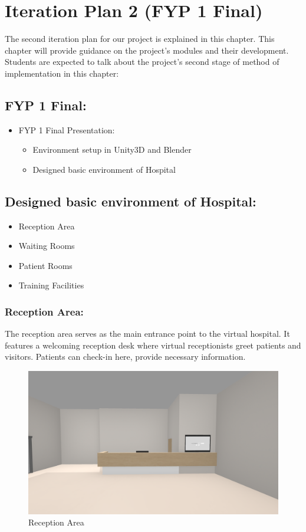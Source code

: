 \chapter{Iteration Plan 2 (FYP 1 Final)}
\label{ch:iter2}

The second iteration plan for our project is explained in this chapter. This chapter will provide guidance on the project’s modules and their development. Students are expected to talk about the project’s second stage of method of implementation in this chapter:

\section{FYP 1 Final:}
\begin{itemize}
    \item FYP 1 Final Presentation: \begin{itemize}
    \item Environment setup in Unity3D and Blender 
    \item Designed basic environment of Hospital
    \end{itemize}
\end{itemize}

\section{Designed basic environment of Hospital:}
	\begin{itemize}
	\item Reception Area
	\item Waiting Rooms
	\item Patient Rooms
	\item Training Facilities
\end{itemize}	
	
\subsection{Reception Area:}
The reception area serves as the main entrance point to the virtual hospital. It features a welcoming reception desk where virtual receptionists greet patients and visitors.
Patients can check-in here, provide necessary information.
	\begin{figure}[h]
		\centering
		\includegraphics[width=0.7\linewidth]{Images/reception envoirnment.png}
		\caption{Reception Area}
		\label{fig:system-diagram}
	\end{figure}
\newline
